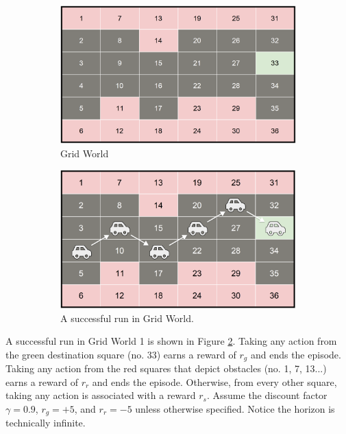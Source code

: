 \begin{figure}[ht]
\begin{subfigure}{.5\textwidth}
  \centering
  \includegraphics[width=.9\linewidth]{gridworld.png}  
  \caption{Grid World}
  \label{fig:fig1.a}
\end{subfigure}
\begin{subfigure}{.5\textwidth}
  \centering
  \includegraphics[width=.9\linewidth]{gridworldcar2.png}  
  \caption{A successful run in Grid World.}
  \label{fig:fig1.b}
\end{subfigure}
\caption{}
\label{fig:fig1}
\end{figure}

A successful run in Grid World 1 is shown in Figure \ref{fig:fig1.b}. Taking any action from the green destination square (no. 33) earns a reward of $r_g$  and ends the episode. Taking any action from the red squares that depict obstacles (no. 1, 7, 13...) earns a reward of $r_r$ and ends the episode. Otherwise, from every other square, taking any action is associated with a reward $r_s$. Assume the discount factor $\gamma = 0.9$, $r_g = +5$, and $r_r = -5$ unless otherwise specified. Notice the horizon is technically infinite. 


